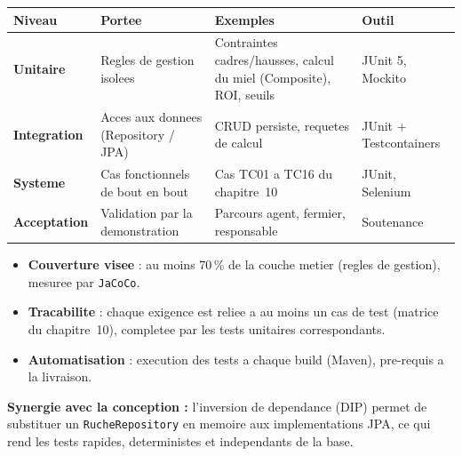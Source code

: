 \begin{xltabular}{\textwidth}{>{\bfseries}p{2.8cm} X p{4.4cm} C{2.2cm}}
\toprule
\textbf{Niveau} & \textbf{Portee} & \textbf{Exemples} & \textbf{Outil} \\
\midrule
\endhead
Unitaire      & Regles de gestion isolees          & Contraintes cadres/hausses, calcul du miel (Composite), ROI, seuils & JUnit 5, Mockito \\
Integration   & Acces aux donnees (Repository / JPA) & CRUD persiste, requetes de calcul                                   & JUnit + Testcontainers \\
Systeme       & Cas fonctionnels de bout en bout    & Cas TC01 a TC16 du chapitre~10                                      & JUnit, Selenium \\
Acceptation   & Validation par la demonstration     & Parcours agent, fermier, responsable                                & Soutenance \\
\bottomrule
\end{xltabular}

\begin{itemize}
  \item \textbf{Couverture visee} : au moins 70\,\% de la couche metier (regles de gestion), mesuree par \texttt{JaCoCo}.
  \item \textbf{Tracabilite} : chaque exigence est reliee a au moins un cas de test (matrice du chapitre~10), completee par les tests unitaires correspondants.
  \item \textbf{Automatisation} : execution des tests a chaque build (Maven), pre-requis a la livraison.
\end{itemize}

\begin{encadre}
\textbf{Synergie avec la conception :} l'inversion de dependance (DIP) permet de
substituer un \texttt{RucheRepository} en memoire aux implementations JPA, ce
qui rend les tests rapides, deterministes et independants de la base.
\end{encadre}
